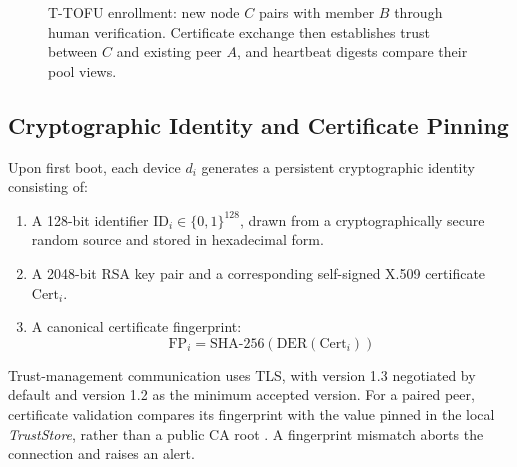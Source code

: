 \documentclass[conference,a4paper]{IEEEtran}
\begin{document}
\begin{figure}[t]
\caption{T-TOFU enrollment: new node $C$ pairs with member $B$ through human verification. Certificate exchange then establishes trust between $C$ and existing peer $A$, and heartbeat digests compare their pool views.}
\label{fig:protocol_flow}
\end{figure}

\subsection{Cryptographic Identity and Certificate Pinning}
Upon first boot, each device $d_i$ generates a persistent cryptographic identity consisting of:
\begin{enumerate}
    \item A 128-bit identifier $\text{ID}_i \in \{0,1\}^{128}$, drawn from a cryptographically secure random source and stored in hexadecimal form.
    \item A 2048-bit RSA key pair and a corresponding self-signed X.509 certificate $\text{Cert}_i$.
    \item A canonical certificate fingerprint:
    \begin{equation}
        \text{FP}_i = \text{SHA-256}(\text{DER}(\text{Cert}_i))
    \end{equation}
\end{enumerate}
Trust-management communication uses TLS, with version 1.3 \cite{rfc8446} negotiated by default and version 1.2 as the minimum accepted version. For a paired peer, certificate validation compares its fingerprint with the value pinned in the local \textit{TrustStore}, rather than a public CA root \cite{pradeep2022pinning}. A fingerprint mismatch aborts the connection and raises an alert.
\end{document}
